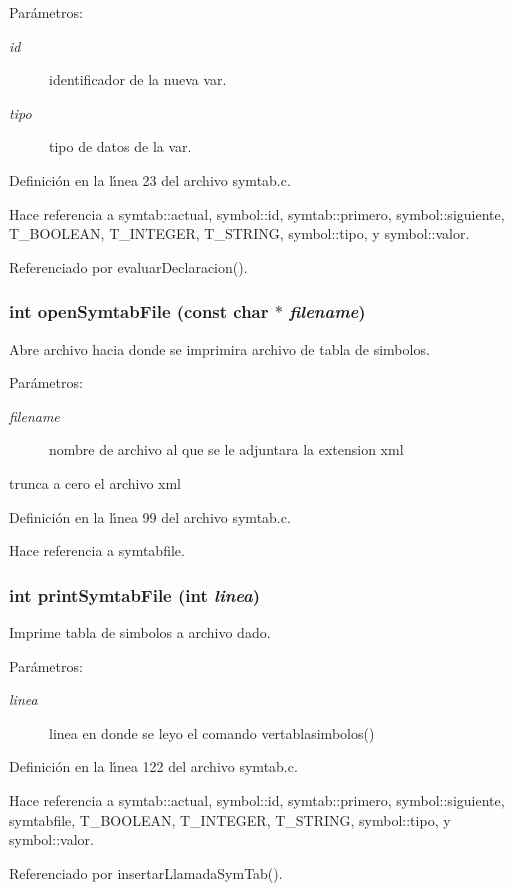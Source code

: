\begin{Desc}
\item[Par\'{a}metros:]
\begin{description}
\item[{\em id}]identificador de la nueva var. \item[{\em tipo}]tipo de datos de la var. \end{description}
\end{Desc}


Definici\'{o}n en la l\'{\i}nea 23 del archivo symtab.c.

Hace referencia a symtab::actual, symbol::id, symtab::primero, symbol::siguiente, T\_\-BOOLEAN, T\_\-INTEGER, T\_\-STRING, symbol::tipo, y symbol::valor.

Referenciado por evaluar\-Declaracion().
\subsubsection{\setlength{\rightskip}{0pt plus 5cm}int open\-Symtab\-File (const char $\ast$ {\em filename})}\label{symtab_8h_a5}


Abre archivo hacia donde se imprimira archivo de tabla de simbolos. 

\begin{Desc}
\item[Par\'{a}metros:]
\begin{description}
\item[{\em filename}]nombre de archivo al que se le adjuntara la extension xml\end{description}
\end{Desc}
trunca a cero el archivo xml 

Definici\'{o}n en la l\'{\i}nea 99 del archivo symtab.c.

Hace referencia a symtabfile.
\subsubsection{\setlength{\rightskip}{0pt plus 5cm}int print\-Symtab\-File (int {\em linea})}\label{symtab_8h_a7}


Imprime tabla de simbolos a archivo dado. 

\begin{Desc}
\item[Par\'{a}metros:]
\begin{description}
\item[{\em linea}]linea en donde se leyo el comando vertablasimbolos() \end{description}
\end{Desc}


Definici\'{o}n en la l\'{\i}nea 122 del archivo symtab.c.

Hace referencia a symtab::actual, symbol::id, symtab::primero, symbol::siguiente, symtabfile, T\_\-BOOLEAN, T\_\-INTEGER, T\_\-STRING, symbol::tipo, y symbol::valor.

Referenciado por insertar\-Llamada\-Sym\-Tab().